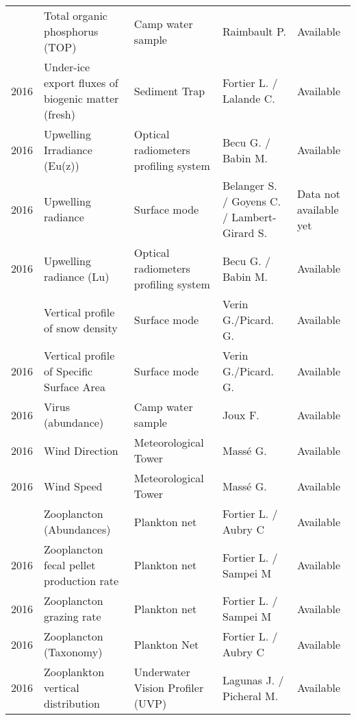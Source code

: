 \documentclass[]{article}
\begin{document}
\begin{landscape}
\begin{longtable}{rllll}
\addlinespace
2016 & Total organic phosphorus (TOP) & Camp water sample & Raimbault P. & Available\\
2016 & Under-ice export fluxes of biogenic matter (fresh) & Sediment Trap & Fortier L. / Lalande C. & Available\\
2016 & Upwelling Irradiance (Eu(z)) & Optical radiometers profiling system & Becu G. / Babin M. & Available\\
2016 & Upwelling radiance & Surface mode & Belanger S. / Goyens C. / Lambert-Girard S. & Data not available yet\\
2016 & Upwelling radiance (Lu) & Optical radiometers profiling system & Becu G. / Babin M. & Available\\
\addlinespace
2016 & Vertical profile of snow density & Surface mode & Verin G./Picard. G. & Available\\
2016 & Vertical profile of Specific Surface Area & Surface mode & Verin G./Picard. G. & Available\\
2016 & Virus (abundance) & Camp water sample & Joux F. & Available\\
2016 & Wind Direction & Meteorological Tower & Massé G. & Available\\
2016 & Wind Speed & Meteorological Tower & Massé G. & Available\\
\addlinespace
2016 & Zooplancton (Abundances) & Plankton net & Fortier L. / Aubry C & Available\\
2016 & Zooplancton fecal pellet production rate & Plankton net & Fortier L. / Sampei M & Available\\
2016 & Zooplancton grazing rate & Plankton net & Fortier L. / Sampei M & Available\\
2016 & Zooplancton (Taxonomy) & Plankton Net & Fortier L. / Aubry C & Available\\
2016 & Zooplankton vertical distribution & Underwater Vision Profiler (UVP) & Lagunas J. / Picheral M. & Available\\*
\end{longtable}
\endgroup{}
\end{landscape}
\end{document}
